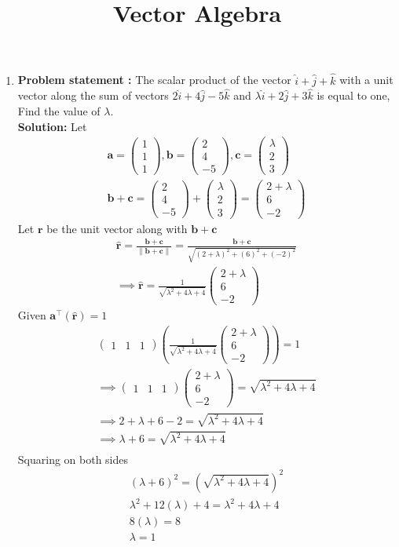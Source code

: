 \documentclass[10pt]{article}
\providecommand{\brak}[1]{\ensuremath{\left(#1\right)}}
\newcommand{\solution}{\noindent \textbf{Solution: }}
\newcommand{\myvec}[1]{\ensuremath{\begin{pmatrix}#1\end{pmatrix}}}
\providecommand{\norm}[1]{\left\lVert#1\right\rVert}
\let\vec\mathbf{}
\begin{document}
\begin{center}
\title{\textbf{Vector Algebra}}
\date{\vspace{-5ex}} %
\maketitle
\end{center}

\begin{enumerate}
\item\textbf{Problem statement :} The scalar product of the vector $\hat{i}+\hat{j}+\hat{k}$ with a unit vector along the sum of vectors $2\hat{i}+4\hat{j}-5\hat{k}$ and $\lambda\hat{i}+2\hat{j}+3\hat{k}$ is equal to one, Find the value of $\lambda$.
\\
\solution
Let
\begin{align}
\vec{a} =\myvec{1\\1\\1} , \vec{b}=\myvec{2\\4\\-5} , \vec{c}=\myvec{\lambda\\2\\3}\\
\vec{b}+\vec{c}=\myvec{2\\4\\-5}+\myvec{\lambda\\2\\3}=\myvec{2+\lambda\\6\\-2}
\end{align}
Let $\vec{r}$ be the unit vector along with $\vec{b}+\vec{c}$
\begin{align}
\hat{\vec{r}}=\frac{\vec{b}+\vec{c}}{\norm{\vec{b}+\vec{c}}}=\frac{\vec{b}+\vec{c}}{\sqrt{\brak{2+\lambda}^2+\brak{6}^2+\brak{-2}^2}}\\
\implies\hat{\vec{r}}=\frac{1}{\sqrt{\lambda^2+4\lambda+4}}\myvec{2+\lambda\\6\\-2}
\end{align}
Given $\vec{a}^\top\brak{\vec{\hat{r}}} = 1$
\begin{align}
	\myvec{1&1&1}\brak{\frac{1}{
		{\sqrt{\lambda^2+4\lambda+4}}}\myvec{2+\lambda\\6\\-2}}=1\\
\implies \myvec{1&1&1}\myvec{2+\lambda\\6\\-2}={\sqrt{\lambda^2+4\lambda+4}}\\
\implies 2+\lambda+6-2 = {\sqrt{\lambda^2+4\lambda+4}} \\
\implies \lambda+6 = {\sqrt{\lambda^2+4\lambda+4}}\\
\end{align}
Squaring on both sides
\begin{align}
    \brak{\lambda+6}^2 = \brak{{\sqrt{\lambda^2+4\lambda+4}}}^2\\
    \lambda^2+12\brak{\lambda}+4 = \lambda^2+4\lambda+4\\
    8\brak{\lambda} = 8\\
    \lambda = 1
\end{align}
\end{enumerate}
\end{document}
